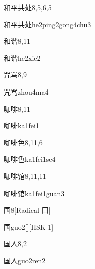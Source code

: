\begin{entry}{和平共处}{8,5,6,5}
  \begin{phonetics}{和平共处}{he2ping2gong4chu3}
  \end{phonetics}
\end{entry}

\begin{entry}{和谐}{8,11}
  \begin{phonetics}{和谐}{he2xie2}
  \end{phonetics}
\end{entry}

\begin{entry}{咒骂}{8,9}
  \begin{phonetics}{咒骂}{zhou4ma4}
  \end{phonetics}
\end{entry}

\begin{entry}{咖啡}{8,11}
  \begin{phonetics}{咖啡}{ka1fei1}
  \end{phonetics}
\end{entry}

\begin{entry}{咖啡色}{8,11,6}
  \begin{phonetics}{咖啡色}{ka1fei1se4}
  \end{phonetics}
\end{entry}

\begin{entry}{咖啡馆}{8,11,11}
  \begin{phonetics}{咖啡馆}{ka1fei1guan3}
  \end{phonetics}
\end{entry}

\begin{entry}{国}{8}[Radical ⼞]
  \begin{phonetics}{国}{guo2}[][HSK 1]
  \end{phonetics}
\end{entry}

\begin{entry}{国人}{8,2}
  \begin{phonetics}{国人}{guo2ren2}
  \end{phonetics}
\end{entry}


